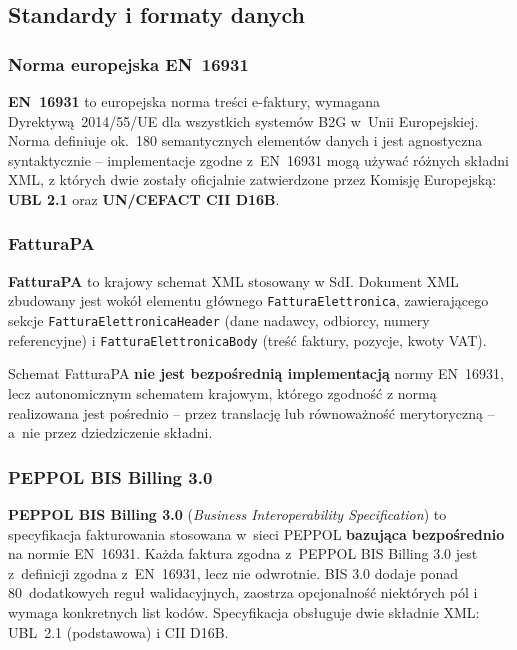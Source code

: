\subsection{Standardy i formaty danych}
\label{sec:porownanie-standardy-formaty}

\subsubsection{Norma europejska EN~16931}
\label{sec:porownanie-en16931}

\textbf{EN~16931} to europejska norma treści e-faktury, wymagana Dyrektywą~2014/55/UE dla wszystkich systemów B2G w~Unii Europejskiej. Norma definiuje ok.~180 semantycznych elementów danych i jest agnostyczna syntaktycznie -- implementacje zgodne z~EN~16931 mogą używać różnych składni XML, z których dwie zostały oficjalnie zatwierdzone przez Komisję Europejską: \textbf{UBL 2.1} oraz \textbf{UN/CEFACT CII D16B}. \cite{en16931-1,dir-2014-55-ue}

\subsubsection{FatturaPA}
\label{sec:porownanie-fatturapa}

\textbf{FatturaPA} to krajowy schemat XML stosowany w SdI. Dokument XML zbudowany jest wokół elementu głównego \texttt{FatturaElettronica}, zawierającego sekcje \texttt{FatturaElettronicaHeader} (dane nadawcy, odbiorcy, numery referencyjne) i \texttt{FatturaElettronicaBody} (treść faktury, pozycje, kwoty VAT). \cite{sdi-fatturapa-format}

Schemat FatturaPA \textbf{nie jest bezpośrednią implementacją} normy EN~16931, lecz autonomicznym schematem krajowym, którego zgodność z normą realizowana jest pośrednio -- przez translację lub równoważność merytoryczną -- a~nie przez dziedziczenie składni.

\subsubsection{PEPPOL BIS Billing 3.0}
\label{sec:porownanie-bis-billing}

\textbf{PEPPOL BIS Billing 3.0} (\textit{Business Interoperability Specification}) to specyfikacja fakturowania stosowana w~sieci PEPPOL \textbf{bazująca bezpośrednio} na normie EN~16931. Każda faktura zgodna z~PEPPOL BIS Billing 3.0 jest z~definicji zgodna z~EN~16931, lecz nie odwrotnie. BIS 3.0 dodaje ponad 80~dodatkowych reguł walidacyjnych, zaostrza opcjonalność niektórych pól i wymaga konkretnych list kodów. Specyfikacja obsługuje dwie składnie XML: UBL~2.1 (podstawowa) i CII D16B. \cite{peppol-bis-billing-3}

